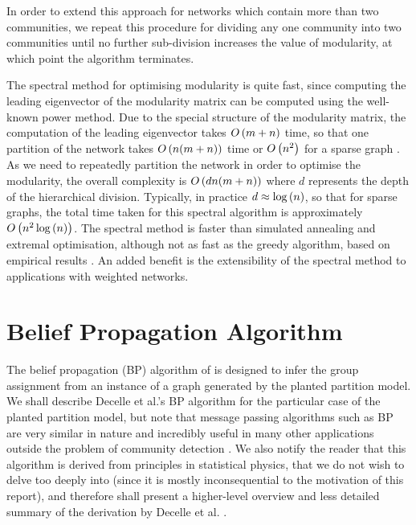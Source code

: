 In order to extend this approach for networks which contain more than two communities, we repeat this procedure for dividing any one community into two communities until no further sub-division increases the value of modularity, at which point the algorithm terminates.

The spectral method for optimising modularity is quite fast, since computing the leading eigenvector of the modularity matrix can be computed using the well-known power method.
Due to the special structure of the modularity matrix, the computation of the leading eigenvector takes $O\left(m+n\right)$ time, so that one partition of the network takes $O\left(n(m+n)\right)$ time or $O\left(n^{2}\right)$ for a sparse graph \cite{For10}.
As we need to repeatedly partition the network in order to optimise the modularity, the overall complexity is $O\left(dn(m+n)\right)$ where $d$ represents the depth of the hierarchical division.
Typically, in practice $d \approx \log \left( n \right)$, so that for sparse graphs, the total time taken for this spectral algorithm is approximately $O\left(n^{2}\log \left( n \right)\right)$.
The spectral method is faster than simulated annealing and extremal optimisation, although not as fast as the greedy algorithm, based on empirical results \cite{For10}.
An added benefit is the extensibility of the spectral method to applications with weighted networks.


\section{Belief Propagation Algorithm}
\label{sec:beliefPropagationAlgorithm}

The belief propagation (BP) algorithm of \cite{Has06,DKM+13} is designed to infer the group assignment from an instance of a graph generated by the planted partition model.
We shall describe Decelle et al.'s BP algorithm \cite{DKM+13} for the particular case of the planted partition model, but note that message passing algorithms such as BP are very similar in nature and incredibly useful in many other applications outside the problem of community detection \cite{For10}.
We also notify the reader that this algorithm is derived from principles in statistical physics, that we do not wish to delve too deeply into (since it is mostly inconsequential to the motivation of this report), and therefore shall present a higher-level overview and less detailed summary of the derivation by Decelle et al. \cite{DKM+13}. 

